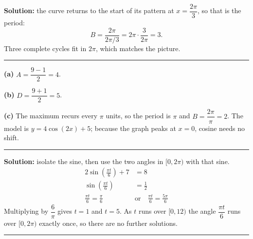 \documentclass[12pt]{article}
\begin{document}

\textbf{Solution:} the curve returns to the start of its pattern at $x = \dfrac{2\pi}{3}$, so that is the period:
\[ B = \frac{2\pi}{2\pi/3} = 2\pi \cdot \frac{3}{2\pi} = 3. \]
Three complete cycles fit in $2\pi$, which matches the picture. 

\vspace{0.1cm}\noindent\rule{\linewidth}{0.2pt}\vspace{0.1cm}


\textbf{(a)} $A = \dfrac{9 - 1}{2} = 4$. 

\textbf{(b)} $D = \dfrac{9 + 1}{2} = 5$. 

\textbf{(c)} The maximum recurs every $\pi$ units, so the period is $\pi$ and $B = \dfrac{2\pi}{\pi} = 2$. The model is $y = 4\cos(2x) + 5$; because the graph peaks at $x = 0$, cosine needs no shift. 

\vspace{0.1cm}\noindent\rule{\linewidth}{0.2pt}\vspace{0.1cm}


\textbf{Solution:} isolate the sine, then use the two angles in $[0, 2\pi)$ with that sine.
\begin{align*}
  2\sin\!\left(\frac{\pi t}{6}\right) + 7 &= 8 \\
  \sin\!\left(\frac{\pi t}{6}\right) &= \frac{1}{2} \\
  \frac{\pi t}{6} = \frac{\pi}{6} \quad&\text{or}\quad \frac{\pi t}{6} = \frac{5\pi}{6}
\end{align*}
Multiplying by $\dfrac{6}{\pi}$ gives $t = 1$ and $t = 5$. As $t$ runs over $[0, 12)$ the angle $\dfrac{\pi t}{6}$ runs over $[0, 2\pi)$ exactly once, so there are no further solutions. 

\vspace{0.1cm}\noindent\rule{\linewidth}{0.2pt}\vspace{0.1cm}

\end{document}
